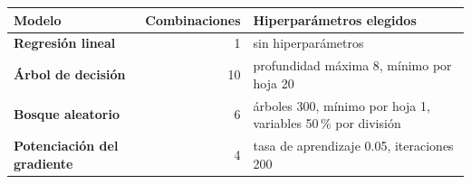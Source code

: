 \renewcommand{\arraystretch}{1.2}
\begin{tabular}{|l|r|>{\raggedright\arraybackslash}p{7.2cm}|}
\hline
\rowcolor{gray!20} \textbf{Modelo} & \textbf{Combinaciones} & \textbf{Hiperparámetros elegidos} \\
\hline
\textbf{Regresión lineal} & 1 & sin hiperparámetros \\
\hline
\textbf{Árbol de decisión} & 10 & profundidad máxima 8, mínimo por hoja 20 \\
\hline
\textbf{Bosque aleatorio} & 6 & árboles 300, mínimo por hoja 1, variables 50\,\% por división \\
\hline
\textbf{Potenciación del gradiente} & 4 & tasa de aprendizaje 0.05, iteraciones 200 \\
\hline
\end{tabular}
